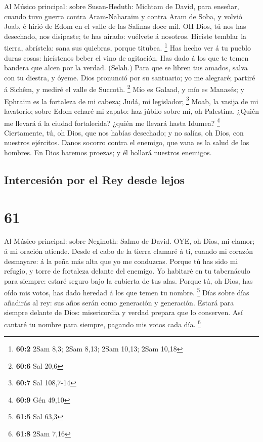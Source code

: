  Al Músico principal: sobre Susan-Heduth: Michtam de David,
para enseñar, cuando tuvo guerra contra Aram-Naharaim y contra Aram de
Soba, y volvió Joab, é hirió de Edom en el valle de las Salinas doce
mil. OH Dios, tú nos has desechado, nos disipaste; te has airado:
vuélvete á nosotros.  Hiciste temblar la tierra, abrístela:
sana sus quiebras, porque titubea. \footnote{\textbf{60:2} 2Sam 8,3;
  2Sam 8,13; 2Sam 10,13; 2Sam 10,18}  Has hecho ver á tu
pueblo duras cosas: hicístenos beber el vino de agitación. 
Has dado á los que te temen bandera que alcen por la verdad. (Selah.)
 Para que se libren tus amados, salva con tu diestra, y
óyeme.  Dios pronunció por su santuario; yo me alegraré;
partiré á Sichêm, y mediré el valle de Succoth. \footnote{\textbf{60:6}
  Sal 20,6}  Mío es Galaad, y mío es Manasés; y Ephraim es
la fortaleza de mi cabeza; Judá, mi legislador; \footnote{\textbf{60:7}
  Sal 108,7-14}  Moab, la vasija de mi lavatorio; sobre Edom
echaré mi zapato: haz júbilo sobre mí, oh Palestina.  ¿Quién
me llevará á la ciudad fortalecida? ¿quién me llevará hasta Idumea?
\footnote{\textbf{60:9} Gén 49,10}  Ciertamente, tú, oh
Dios, que nos habías desechado; y no salías, oh Dios, con nuestros
ejércitos.  Danos socorro contra el enemigo, que vana es la
salud de los hombres.  En Dios haremos proezas; y él
hollará nuestros enemigos.

\hypertarget{intercesiuxf3n-por-el-rey-desde-lejos}{%
\subsection{Intercesión por el Rey desde
lejos}\label{intercesiuxf3n-por-el-rey-desde-lejos}}

\hypertarget{section-60}{%
\section{61}\label{section-60}}

 Al Músico principal: sobre Neginoth: Salmo de David. OYE,
oh Dios, mi clamor; á mi oración atiende.  Desde el cabo de
la tierra clamaré á ti, cuando mi corazón desmayare: á la peña más alta
que yo me conduzcas.  Porque tú has sido mi refugio, y torre
de fortaleza delante del enemigo.  Yo habitaré en tu
tabernáculo para siempre: estaré seguro bajo la cubierta de tus alas.
 Porque tú, oh Dios, has oído mis votos, has dado heredad á
los que temen tu nombre. \footnote{\textbf{61:5} Sal 63,3} 
Días sobre días añadirás al rey: sus años serán como generación y
generación.  Estará para siempre delante de Dios:
misericordia y verdad prepara que lo conserven.  Así cantaré
tu nombre para siempre, pagando mis votos cada día. \footnote{\textbf{61:8}
  2Sam 7,16}

